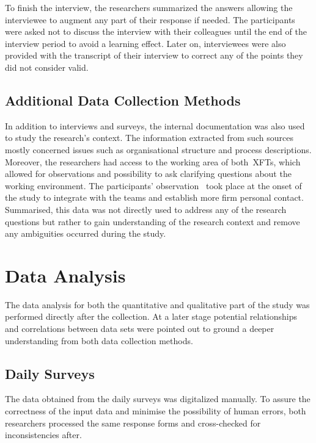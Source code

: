 To finish the interview, the researchers summarized the answers allowing the interviewee to augment any part of their response if needed. The participants were asked not to discuss the interview with their colleagues until the end of the interview period to avoid a learning effect. Later on, interviewees were also provided with the transcript of their interview to correct any of the points they did not consider valid.

\subsection{Additional Data Collection Methods}

In addition to interviews and surveys, the internal documentation was also used to study the research's context. The information extracted from such sources mostly concerned issues such as organisational structure and process descriptions.
Moreover, the researchers had access to the working area of both~\acp{XFT}, which allowed for observations and possibility to ask clarifying questions about the working environment. The participants' observation~\citep{Lethbridge05studyingsoftware} took place at the onset of the study to integrate with the teams and establish more firm personal contact. Summarised, this data was not directly used to address any of the research questions but rather to gain understanding of the research context and remove any ambiguities occurred during the study.

\section{Data Analysis}

The data analysis for both the quantitative and qualitative part of the study was performed directly after the collection. At a later stage potential relationships and correlations between data sets were pointed out to ground a deeper understanding from both data collection methods. 

\subsection{Daily Surveys}
 
The data obtained from the daily surveys was digitalized manually. To assure the correctness of the input data and minimise the possibility of human errors, both researchers processed the same response forms and cross-checked for inconsistencies after.

